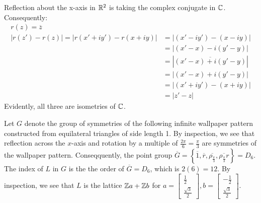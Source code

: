 \documentclass{article}
\begin{document}
Reflection about the x-axis in $\mathbb{R}^2$ is taking the complex conjugate in $\mathbb{C}$. Consequently:
\begin{equation}
    \begin{split}
        r\left(z\right) = \overline{z} \\
        \left|r\left(z'\right) - r\left(z\right)\right| = \left|r\left(x' + iy'\right) - r\left(x + iy\right)\right| & = \left|\left(x' - iy'\right) - \left(x - iy\right)\right| \\
        & = \left|\left(x' - x\right) - i\left(y' - y\right)\right| \\
        & = \left|\overline{\left(x' - x\right) + i\left(y' - y\right)}\right| \\
        & = \left|\left(x' - x\right) + i\left(y' - y\right)\right| \\
        & = \left|\left(x' + iy'\right) - \left(x + iy\right)\right| \\
        & = \left|z' - z\right|
    \end{split}
\end{equation}
Evidently, all three are isometries of $\mathbb{C}$.

\clearpage

Let $G$ denote the group of symmetries of the following infinite wallpaper pattern constructed from equilateral triangles of side length 1. By inspection, we see that reflection across the $x$-axis and rotation by a multiple of $\frac{2\pi}{6} = \frac{\pi}{3}$ are symmetries of the wallpaper pattern. Conseqquently, the point group $\overline{G} = \left\{\overline{1}, \overline{r}, \overline{\rho_{\frac{\pi}{3}}}, \overline{\rho_{\frac{\pi}{3}}r}\right\} = D_6$. The index of $L$ in $G$ is the the order of $\overline{G} = D_6$, which is $2\left(6\right) = 12$.
By inspection, we see that $L$ is the lattice $\mathbb{Z} a + \mathbb{Z} b$ for $a = \begin{bmatrix}
    \frac{1}{2} \\ \frac{\sqrt{3}}{2}
\end{bmatrix}, b = \begin{bmatrix}
    -\frac{1}{2} \\ \frac{\sqrt{3}}{2}
\end{bmatrix}$.
\end{document}
